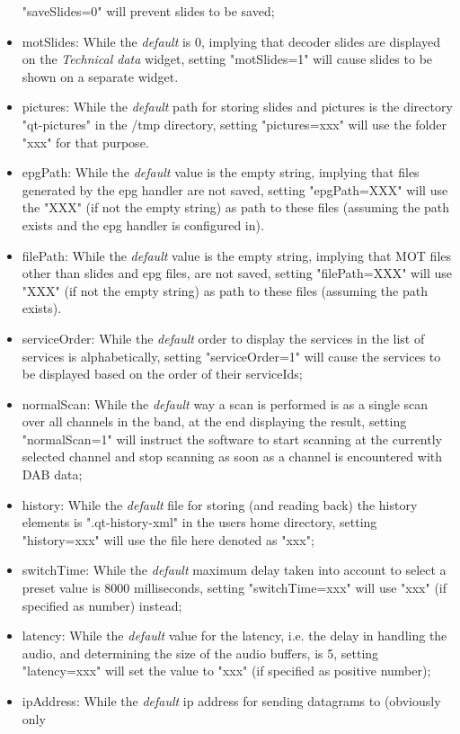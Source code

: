\documentclass[12pt]{article}
\begin{document}
\begin{itemize}
"saveSlides=0" will prevent slides to be saved;
\item motSlides:
While the {\em default} is 0, implying that decoder slides are displayed
on the {\em Technical data} widget, setting "motSlides=1" will cause
slides to be shown on a separate widget.
\item pictures:
While the {\em default} path for storing slides and pictures is the directory
"qt-pictures" in the /tmp directory, setting "pictures=xxx" will
use the folder "xxx" for that purpose.
\item epgPath:
While the {\em default} value is the empty string, implying that
files generated by the epg handler are not saved, setting "epgPath=XXX"
will use the "XXX" (if not the empty string) as path to these files
(assuming the path exists and the epg handler is configured in).
\item filePath:
While the {\em default} value is the empty string, implying that MOT files
other than slides and epg files, are not saved, setting "filePath=XXX"
will use "XXX" (if not the empty string) as path to these files
(assuming the path exists).
\item serviceOrder:
While the {\em default} order to display the services in the list of services
is alphabetically, setting "serviceOrder=1" will cause the services
to be displayed based on the order of their serviceIds;
\item normalScan:
While the {\em default} way a scan is performed is as a single scan
over all channels in the band, at the end displaying the result,
setting "normalScan=1" will instruct the software to start scanning
at the currently selected channel and stop scanning
as soon as a channel is encountered with DAB data;
\item history:
While the {\em default} file for storing (and reading back) the history
elements is ".qt-history-xml" in the users home directory, setting
"history=xxx" will use the file here denoted as "xxx";
\item switchTime:
While the {\em default} maximum delay taken into account to
select a preset value is 8000 milliseconds,
setting "switchTime=xxx" will use "xxx" (if specified 
as number) instead;
\item latency:
While the {\em default} value for the latency, i.e. the delay in handling the
audio, and determining the size of the audio buffers, is 5, setting
"latency=xxx" will set the value to "xxx" (if specified as positive number);
\item ipAddress:
While the {\em default} ip address for sending datagrams to (obviously only

\end{itemize}
\end{document}
